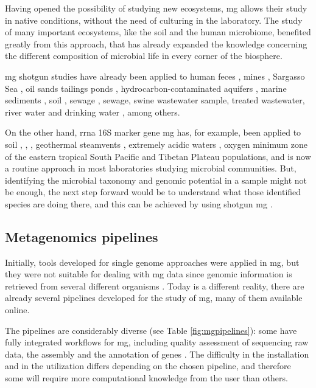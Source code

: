 \documentclass[
  oneside,
  11pt, a4paper,
  footinclude=true,
  headinclude=true,
  cleardoublepage=empty
]{scrbook}
\begin{document}
    Having opened the possibility of studying new ecosystems, \gls{mg} allows their study in native conditions, without the need of culturing in the laboratory. The study of many important ecosystems, like the soil and the human microbiome, benefited greatly from this approach, that has already expanded the knowledge concerning the different composition of microbial life in every corner of the biosphere. 
    
    \gls{mg} shotgun studies have already been applied to human feces \citep{Breitbart2003, vzifvcakova2016microbial}, mines \citep{Tyson2004}, Sargasso Sea \citep{Venter2004}, oil sands tailings ponds \citep{Tan2015}, hydrocarbon-contaminated aquifers \citep{Tan2015}, marine sediments \citep{Urich2014}, soil \citep{vzifvcakova2016microbial}, sewage \citep{vzifvcakova2016microbial}, sewage, swine wastewater sample, treated wastewater, river water and drinking water \citep{vzifvcakova2016microbial}, among others.
    
    On the other hand, \gls{rrna} 16S marker gene \gls{mg} has, for example, been applied to soil \citep{Pearce2012}, \citep{Goebiewski2014}, \citep{Damon2012}, geothermal steamvents \citep{Benson2011}, extremely acidic waters \citep{Garcia-Moyano2012}, oxygen minimum zone of the eastern tropical South Pacific \citep{Stevens2008} and Tibetan Plateau \citep{Xiong2012} populations, and is now a routine approach in most laboratories studying microbial communities. But, identifying the microbial taxonomy and genomic potential in a sample might not be enough, the next step forward would be to understand what those identified species are doing there, and this can be achieved by using shotgun \gls{mg} \citep{Tringe2005,Thomas2012}.
    
    \subsection{Metagenomics pipelines}
    
    Initially, tools developed for single genome approaches were applied in \gls{mg}, but they were not suitable for dealing with \gls{mg} data since genomic information is retrieved from several different organisms \citep{Oulas2015}. Today is a different reality, there are already several pipelines developed for the study of \gls{mg}, many of them available online.
    
    The pipelines are considerably diverse (see Table \ref{fig:mgpipelines}): some have fully integrated workflows for \gls{mg}, including quality assessment of sequencing raw data, the assembly and the annotation of genes \citep{arumugam2010smashcommunity, treangen2013metamos}. The difficulty in the installation and in the utilization differs depending on the chosen pipeline, and therefore some will require more computational knowledge from the user than others. 
    
\end{document}
